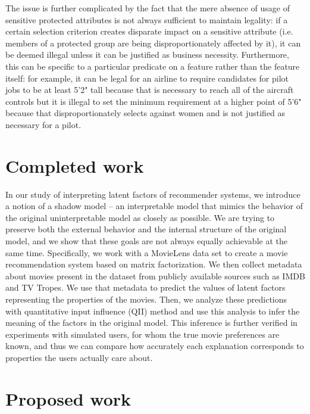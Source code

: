 The issue is further complicated by the fact that the mere absence of usage of
sensitive protected attributes is not always sufficient to maintain legality:
if a certain selection criterion creates disparate impact on a sensitive
attribute (i.e. members of a protected group are being disproportionately
affected by it), it can be deemed illegal unless it can be justified as business
necessity. Furthermore, this can be specific to a particular predicate on a
feature rather than the feature itself: for example, it can be legal for an
airline to require candidates for pilot jobs to be at least 5'2" tall because
that is necessary to reach all of the aircraft controls but it is illegal to
set the minimum requirement at a higher point of 5'6" because that
disproportionately selects against women and is not justified as necessary
for a pilot\cite{RoseMaryCourtCase}.

\section{Completed work}

In our study of interpreting latent factors of recommender systems, we introduce
a notion of a shadow model -- an interpretable model that mimics the behavior
of the original uninterpretable model as closely as possible. We are trying to
preserve both the external behavior and the internal structure of the original
model, and we show that these goals are not always equally achievable at the
same time. Specifically, we work with a MovieLens data set to create a
movie recommendation system based on matrix factorization. We then collect
metadata about movies present in the dataset from publicly available sources
such as IMDB and TV Tropes. We use that metadata to predict the values of latent
factors representing the properties of the movies. Then, we analyze these
predictions with quantitative input influence (QII) method
\cite{datta2016algorithmic} and use this analysis to infer the meaning of the
factors in the original model. This inference is further verified in experiments
with simulated users, for whom the true movie preferences are known, and thus
we can compare how accurately each explanation corresponds to properties the
users actually care about.

\section{Proposed work}

